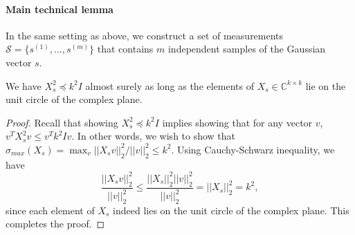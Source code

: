 \paragraph{Main technical lemma} In the same setting as above, we construct a set of measurements $\mathcal{S}=\{s^{(1)},\ldots,s^{(m)}\}$ that contains $m$ independent samples of the Gaussian vector $s$.
\begin{fact}
    We have $X_s^2\preceq k^2I$ almost surely as long as the elements of $X_s\in\mathbb{C}^{k\times k}$ lie on the unit circle of the complex plane.
\end{fact}
\begin{proof}
    Recall that showing $X_s^2\preceq k^2I$ implies showing that for any vector $v$, $v^TX_s^2v\leq v^Tk^2Iv$. In other words, we wish to show that $\sigma_{max}(X_s)=\max_v||X_sv||_2^2/||v||_2^2\leq k^2$. Using Cauchy-Schwarz inequality, we have $$\frac{||X_sv||_2^2}{||v||_2^2}\leq\frac{||X_s||_2^2||v||_2^2}{||v||_2^2}=||X_s||_2^2=k^2,$$ since each element of $X_s$ indeed lies on the unit circle of the complex plane. This completes the proof.
\end{proof}